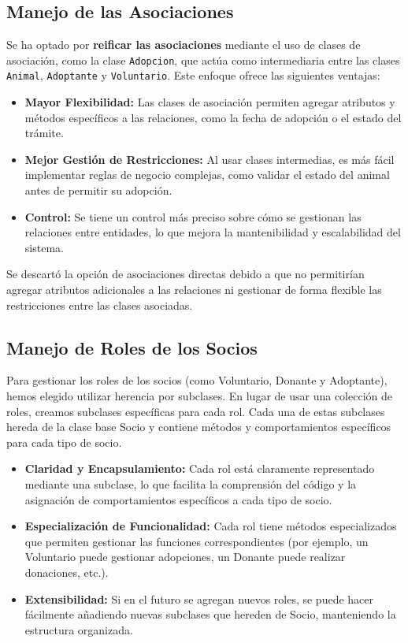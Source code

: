 \subsection{Manejo de las Asociaciones}

Se ha optado por \textbf{reificar las asociaciones} mediante el uso de clases de asociación, como la clase \texttt{Adopcion}, que actúa como intermediaria entre las clases \texttt{Animal}, \texttt{Adoptante} y \texttt{Voluntario}. Este enfoque ofrece las siguientes ventajas:

\begin{itemize}
    \item \textbf{Mayor Flexibilidad:} Las clases de asociación permiten agregar atributos y métodos específicos a las relaciones, como la fecha de adopción o el estado del trámite.
    \item \textbf{Mejor Gestión de Restricciones:} Al usar clases intermedias, es más fácil implementar reglas de negocio complejas, como validar el estado del animal antes de permitir su adopción.
    \item \textbf{Control:} Se tiene un control más preciso sobre cómo se gestionan las relaciones entre entidades, lo que mejora la mantenibilidad y escalabilidad del sistema.
\end{itemize}

Se descartó la opción de asociaciones directas debido a que no permitirían agregar atributos adicionales a las relaciones ni gestionar de forma flexible las restricciones entre las clases asociadas.

\subsection{Manejo de Roles de los Socios}

Para gestionar los roles de los socios (como Voluntario, Donante y Adoptante), hemos elegido utilizar herencia por subclases. En lugar de usar una colección de roles, creamos subclases específicas para cada rol. Cada una de estas subclases hereda de la clase base Socio y contiene métodos y comportamientos específicos para cada tipo de socio.

\begin{itemize}
    \item \textbf{Claridad y Encapsulamiento:} Cada rol está claramente representado mediante una subclase, lo que facilita la comprensión del código y la asignación de comportamientos específicos a cada tipo de socio.
    \item \textbf{Especialización de Funcionalidad:} Cada rol tiene métodos especializados que permiten gestionar las funciones correspondientes (por ejemplo, un Voluntario puede gestionar adopciones, un Donante puede realizar donaciones, etc.).
    \item \textbf{Extensibilidad:} Si en el futuro se agregan nuevos roles, se puede hacer fácilmente añadiendo nuevas subclases que hereden de Socio, manteniendo la estructura organizada.
\end{itemize}

